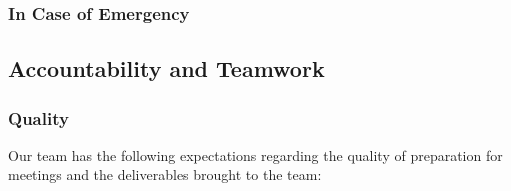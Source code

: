 \documentclass{article}
\begin{document}
\subsubsection*{In Case of Emergency}


\subsection*{Accountability and Teamwork}

\subsubsection*{Quality}

Our team has the following expectations regarding the quality of preparation for meetings and the deliverables brought to the team:
\end{document}
